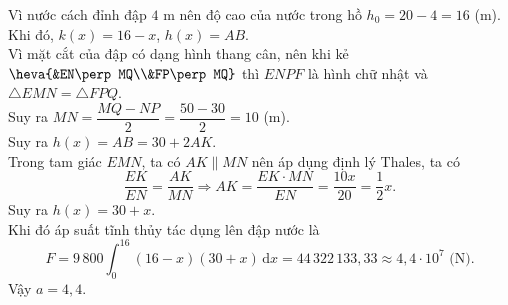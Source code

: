 \begin{bt}
{		Vì nước cách đỉnh đập $4$ m nên độ  cao của nước trong hồ $h_0=20-4=16$ (m).\\
		Khi đó, $k(x)=16-x$,  $h(x)=AB$.\\
		Vì mặt cắt của đập có dạng hình thang cân, nên  khi kẻ $\heva{&EN\perp MQ\\&FP\perp MQ}$ thì $ENPF$ là hình chữ nhật và $\triangle EMN=\triangle FPQ$.\\
		Suy ra  $MN=\dfrac{MQ-NP}{2}=\dfrac{50-30}{2}=10$ (m).\\
		Suy ra $h(x)=AB=30+2AK$.\\ 
		Trong tam giác $EMN$, ta có $AK\parallel MN$ nên áp  dụng định lý Thales, ta có \[\dfrac{EK}{EN}=\dfrac{AK}{MN}\Rightarrow AK=\dfrac{EK\cdot MN}{EN}=\dfrac{10x}{20}=\dfrac{1}{2} x.\]
		Suy ra  $h(x)=30+x$.\\
		Khi đó áp suất tĩnh thủy  tác dụng lên đập nước là
		\[F=9\,800\displaystyle\int_0^{16}(16-x)(30+x)\mathrm{\, d}x=44\,322\,133{,}33\approx 4{,}4\cdot 10^7\text{ (N)}.\] 
		 Vậy $a=4{,}4$.
	 }
\end{bt}

